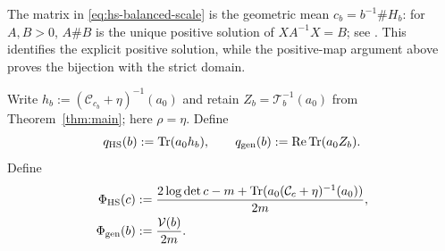 The matrix in \eqref{eq:hs-balanced-scale} is the geometric mean $c_b=b^{-1}\#H_b$: for $A,B>0$, $A\#B$ is the unique positive solution of $XA^{-1}X=B$; see \cite[Section 2]{BJL19}.
This identifies the explicit positive solution, while the positive-map argument above proves the bijection with the strict domain.

Write $h_b:=(\mathcal C_{c_b}+\eta)^{-1}(a_0)$ and retain $Z_b=\mathcal T_b^{-1}(a_0)$ from Theorem~\ref{thm:main}; here $\rho=\eta$.
Define
\begin{equation}\label{eq:hs-energies}
 q_{\rm HS}(b):=\operatorname{Tr}(a_0h_b),\qquad
 q_{\rm gen}(b):=\operatorname{Re}\operatorname{Tr}(a_0Z_b).
\end{equation}
Define
\begin{equation}\label{eq:hs-objectives}
 \begin{split}
 \Phi_{\rm HS}(c)&:=\frac{2\log\det c-m+
             \operatorname{Tr}(a_0(\mathcal C_c+\eta)^{-1}(a_0))}{2m},\\
 \Phi_{\rm gen}(b)&:=\frac{\mathcal V(b)}{2m}.
 \end{split}
\end{equation}

